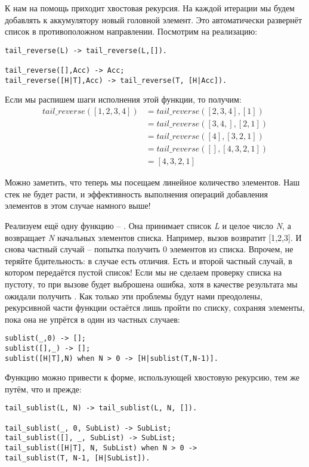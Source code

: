 К нам на помощь приходит хвостовая рекурсия.
На каждой итерации мы будем добавлять к аккумулятору новый головной элемент.
Это автоматически развернёт список в противоположном направлении.
Посмотрим на реализацию:
\begin{lstlisting}[style=erlang]
tail_reverse(L) -> tail_reverse(L,[]).
 
tail_reverse([],Acc) -> Acc;
tail_reverse([H|T],Acc) -> tail_reverse(T, [H|Acc]).
\end{lstlisting}

Если мы распишем шаги исполнения этой функции, то получим:
\begin{align*}
tail\_reverse([1,2,3,4]) &= tail\_reverse([2,3,4], [1])\\
&= tail\_reverse([3,4,], [2,1])\\
&= tail\_reverse([4], [3,2,1])\\
&= tail\_reverse([], [4,3,2,1])\\
&= [4,3,2,1]
\end{align*}

Можно заметить, что теперь мы посещаем линейное количество элементов.
Наш стек не будет расти, и эффективность выполнения операций добавления элементов в этом случае намного выше!

Реализуем ещё одну функцию \--- . Она принимает список \emph{L} и целое число \emph{N}, а возвращает \emph{N} начальных элементов списка.
Например, вызов  возвратит [1,2,3].
И снова частный случай \--- попытка получить 0 элементов из списка.
Впрочем, не теряйте бдительность: в случае  есть отличия.
Есть и второй частный случай, в котором передаётся пустой список!
Если мы не сделаем проверку списка на пустоту, то при вызове  будет выброшена ошибка, хотя в качестве результата мы ожидали получить \ops{[1]}.
Как только эти проблемы будут нами преодолены, рекурсивной части функции остаётся лишь пройти по списку, сохраняя элементы, пока она не упрётся в один из частных случаев:
\begin{lstlisting}[style=erlang]
sublist(_,0) -> [];
sublist([],_) -> [];
sublist([H|T],N) when N > 0 -> [H|sublist(T,N-1)].
\end{lstlisting}

Функцию можно привести к форме, использующей хвостовую рекурсию, тем же путём, что и прежде:
\begin{lstlisting}[style=erlang]
tail_sublist(L, N) -> tail_sublist(L, N, []).
 
tail_sublist(_, 0, SubList) -> SubList;
tail_sublist([], _, SubList) -> SubList;
tail_sublist([H|T], N, SubList) when N > 0 ->
tail_sublist(T, N-1, [H|SubList]).
\end{lstlisting}

